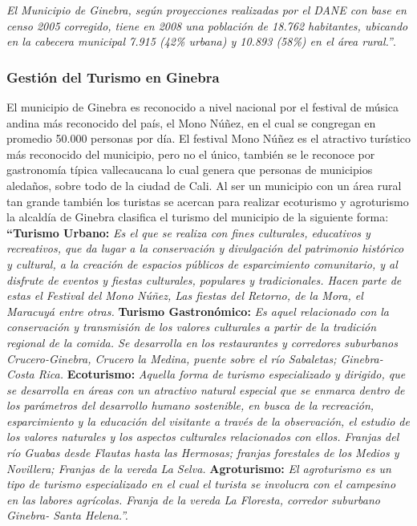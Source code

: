 \documentclass[12pt,letterpaper,openany]{book}
\begin{document}
\textit{El Municipio de Ginebra, según proyecciones realizadas por el DANE con base en censo 2005 corregido, tiene en 2008 una población de 18.762 habitantes, ubicando en la cabecera municipal 7.915 (42\% urbana) y 10.893 (58\%) en el área rural.”}\cite{4}.

\subsubsection{Gestión del Turismo en Ginebra}
El municipio de Ginebra es reconocido a nivel nacional por el festival de música andina más reconocido del país, el Mono Núñez, en el cual se congregan en promedio 50.000 personas por día. El festival Mono Núñez es el atractivo turístico más reconocido del municipio, pero no el único, también se le reconoce por gastronomía típica vallecaucana lo cual genera que personas de municipios aledaños, sobre todo de la ciudad de Cali\cite{3}. Al ser un municipio con un área rural tan grande también los turistas se acercan para realizar ecoturismo y agroturismo\cite{3}\cite{18} la alcaldía de Ginebra clasifica el turismo del municipio de la siguiente forma:
\vspace{5mm}\newline
\textbf{“Turismo Urbano:} \textit{Es el que se realiza con fines culturales, educativos y recreativos, que da lugar a la conservación y divulgación del patrimonio histórico y cultural, a la creación de espacios públicos de esparcimiento comunitario, y al disfrute de eventos y fiestas culturales, populares y tradicionales. Hacen parte de estas el Festival del Mono Núñez, Las fiestas del Retorno, de la Mora, el Maracuyá entre otras.}
\vspace{5mm}\newline
\textbf{Turismo Gastronómico:} \textit{Es aquel relacionado con la conservación y transmisión de los valores culturales a partir de la tradición regional de la comida. Se desarrolla en los restaurantes y corredores suburbanos Crucero-Ginebra, Crucero la Medina, puente sobre el río Sabaletas; Ginebra-Costa Rica.}
\vspace{5mm}\newline
\textbf{Ecoturismo:} \textit{Aquella forma de turismo especializado y dirigido, que se desarrolla en áreas con un atractivo natural especial que se enmarca dentro de los parámetros del desarrollo humano sostenible, en busca de la recreación, esparcimiento y la educación del visitante a través de la observación, el estudio de los valores naturales y los aspectos culturales relacionados con ellos. Franjas del río Guabas desde Flautas hasta las Hermosas; franjas forestales de los Medios y Novillera; Franjas de la vereda La Selva.}
\vspace{5mm}\newline
\textbf{Agroturismo:} \textit{El agroturismo es un tipo de turismo especializado en el cual el turista se involucra con el campesino en las labores agrícolas. Franja de la vereda La Floresta, corredor suburbano Ginebra- Santa Helena.”\cite{18}.}
\end{document}
